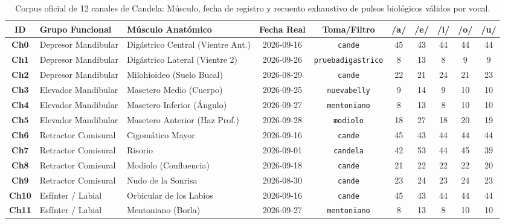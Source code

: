 \documentclass[11pt,a4paper,openany]{book}
\theoremstyle{definition}
\begin{document}
\begin{table}[H]
\centering
\small
\begin{tabularx}{\textwidth}{c l l c c c c c c c}
\toprule
\textbf{ID} & \textbf{Grupo Funcional} & \textbf{Músculo Anatómico} & \textbf{Fecha Real} & \textbf{Toma/Filtro} & \textbf{/a/} & \textbf{/e/} & \textbf{/i/} & \textbf{/o/} & \textbf{/u/} \\
\midrule
\textbf{Ch0} & Depresor Mandibular & Digástrico Central (Vientre Ant.) & 2026-09-16 & \texttt{cande} & 45 & 43 & 44 & 44 & 44 \\
\textbf{Ch1} & Depresor Mandibular & Digástrico Lateral (Vientre 2) & 2026-09-26 & \texttt{pruebadigastrico} & 8 & 13 & 8 & 9 & 9 \\
\textbf{Ch2} & Depresor Mandibular & Milohioideo (Suelo Bucal) & 2026-08-29 & \texttt{cande} & 22 & 21 & 24 & 21 & 23 \\
\midrule
\textbf{Ch3} & Elevador Mandibular & Masetero Medio (Cuerpo) & 2026-09-25 & \texttt{nuevabelly} & 9 & 14 & 9 & 10 & 10 \\
\textbf{Ch4} & Elevador Mandibular & Masetero Inferior (Ángulo) & 2026-09-27 & \texttt{mentoniano} & 8 & 13 & 8 & 10 & 10 \\
\textbf{Ch5} & Elevador Mandibular & Masetero Anterior (Haz Prof.) & 2026-09-28 & \texttt{modiolo} & 18 & 27 & 18 & 20 & 19 \\
\midrule
\textbf{Ch6} & Retractor Comisural & Cigomático Mayor & 2026-09-16 & \texttt{cande} & 45 & 43 & 44 & 44 & 44 \\
\textbf{Ch7} & Retractor Comisural & Risorio & 2026-09-01 & \texttt{candela} & 42 & 53 & 44 & 45 & 39 \\
\textbf{Ch8} & Retractor Comisural & Modiolo (Confluencia) & 2026-09-18 & \texttt{cande} & 21 & 22 & 22 & 22 & 20 \\
\textbf{Ch9} & Retractor Comisural & Nudo de la Sonrisa & 2026-08-30 & \texttt{cande} & 23 & 24 & 23 & 24 & 23 \\
\midrule
\textbf{Ch10} & Esfínter / Labial & Orbicular de los Labios & 2026-09-16 & \texttt{cande} & 45 & 43 & 44 & 44 & 44 \\
\textbf{Ch11} & Esfínter / Labial & Mentoniano (Borla) & 2026-09-27 & \texttt{mentoniano} & 8 & 13 & 8 & 10 & 10 \\
\bottomrule
\end{tabularx}
\caption{Corpus oficial de 12 canales de Candela: Músculo, fecha de registro y recuento exhaustivo de pulsos biológicos válidos por vocal.}
\label{tab:canales_candela}
\end{table}
\end{document}
